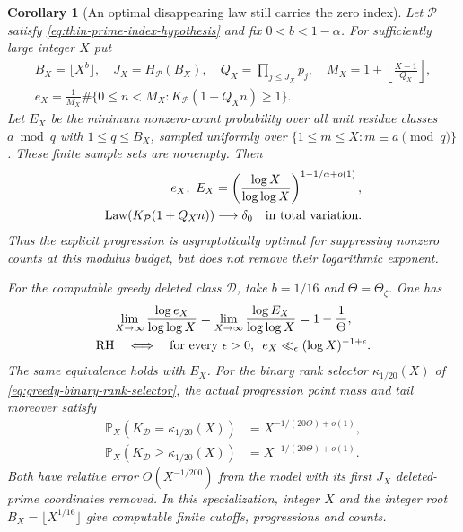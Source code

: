\documentclass[11pt]{article}
\newtheorem{corollary}[theorem]{Corollary}
\theoremstyle{definition}
\begin{document}
\begin{corollary}[An optimal disappearing law still carries the zero index]
\label{cor:primorial-filter-zero-index}
Let $\mathcal P$ satisfy \eqref{eq:thin-prime-index-hypothesis}
and fix $0<b<1-\alpha$.
For sufficiently large integer $X$ put
\begin{equation}
 \begin{gathered}
 B_X=\lfloor X^b\rfloor,\quad
 J_X=H_{\mathcal P}(B_X),\quad Q_X=\prod_{j\le J_X}p_j,\quad
 M_X=1+\left\lfloor\frac{X-1}{Q_X}\right\rfloor,\\
 e_X=\frac1{M_X}\#\{0\le n<M_X:
                         K_{\mathcal P}(1+Q_Xn)\ge1\}.
 \end{gathered}
 \label{eq:primorial-filter-arithmetic-sample}
\end{equation}
Let $E_X$ be the minimum nonzero-count probability over all
unit residue classes $a\bmod q$ with $1\le q\le B_X$,
sampled uniformly over
$\{1\le m\le X:m\equiv a\pmod q\}$.
These finite sample sets are nonempty.  Then
\begin{equation}
 \begin{aligned}
 e_X,\ E_X
  &=\left(\frac{\log X}{\log\log X}\right)^{1-1/\alpha+o(1)},\\
 \operatorname{Law}(K_{\mathcal P}(1+Q_Xn))
  &\longrightarrow\delta_0\quad\hbox{in total variation}.
 \end{aligned}
 \label{eq:primorial-filter-vanishing-profile}
\end{equation}
Thus the explicit progression is asymptotically optimal for
suppressing nonzero counts at this modulus budget, but does
not remove their logarithmic exponent.

For the computable greedy deleted class $\mathcal D$, take
$b=1/16$ and $\Theta=\Theta_\zeta$.  One has
\begin{equation}
 \begin{gathered}
 \lim_{X\to\infty}\frac{\log e_X}{\log\log X}
 =\lim_{X\to\infty}\frac{\log E_X}{\log\log X}
 =1-\frac1\Theta,\\
 {\rm RH}\quad\Longleftrightarrow\quad
 \text{for every $\epsilon>0$, }\
 e_X\ll_\epsilon(\log X)^{-1+\epsilon}.
 \end{gathered}
 \label{eq:primorial-filter-RH}
\end{equation}
The same equivalence holds with $E_X$.
For the binary rank selector $\kappa_{1/20}(X)$ of
\eqref{eq:greedy-binary-rank-selector}, the actual progression
point mass and tail moreover satisfy
\begin{equation}
 \begin{aligned}
 \mathbb P_X(K_{\mathcal D}=\kappa_{1/20}(X))
       &=X^{-1/(20\Theta)+o(1)},\\
 \mathbb P_X(K_{\mathcal D}\ge\kappa_{1/20}(X))
       &=X^{-1/(20\Theta)+o(1)}.
 \end{aligned}
 \label{eq:primorial-filter-rare-zero-index}
\end{equation}
Both have relative error $O(X^{-1/200})$ from the model with
its first $J_X$ deleted-prime coordinates removed.
In this specialization, integer $X$ and the integer root
$B_X=\lfloor X^{1/16}\rfloor$ give computable finite cutoffs,
progressions and counts.
\end{corollary}
\end{document}
